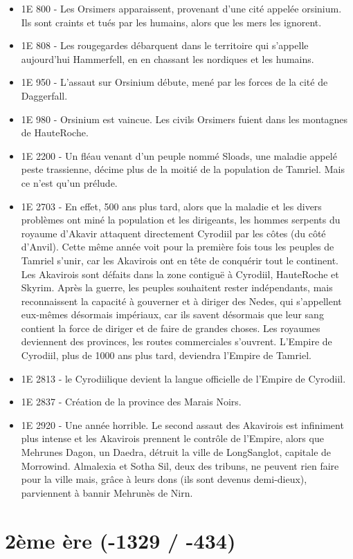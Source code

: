 \begin{itemize}
\item
1E 800 - Les Orsimers apparaissent, provenant d'une cité appelée orsinium. Ils sont craints et tués par les humains, alors que les mers les ignorent.
\item
1E 808 - Les rougegardes débarquent dans le territoire qui s'appelle aujourd'hui Hammerfell, en en chassant les nordiques et les humains.
\item
1E 950 - L'assaut sur Orsinium débute, mené par les forces de la cité de Daggerfall.
\item
1E 980 - Orsinium est vaincue. Les civils Orsimers fuient dans les montagnes de HauteRoche.
\item
1E 2200 - Un fléau venant d'un peuple nommé Sloads, une maladie appelé peste trassienne, décime plus de la moitié de la population de Tamriel. Mais ce n'est qu'un prélude.
\item
1E 2703 - En effet, 500 ans plus tard, alors que la maladie et les divers problèmes ont miné la population et les dirigeants, les hommes serpents du royaume d'Akavir attaquent directement Cyrodiil par les côtes (du côté d'Anvil). Cette même année voit pour la première fois tous les peuples de Tamriel s'unir, car les Akavirois ont en tête de conquérir tout le continent. Les Akavirois sont défaits dans la zone contiguë à Cyrodiil, HauteRoche et Skyrim. Après la guerre, les peuples souhaitent rester indépendants, mais reconnaissent la capacité à gouverner et à diriger des Nedes, qui s'appellent eux-mêmes désormais impériaux, car ils savent désormais que leur sang contient la force de diriger et de faire de grandes choses. Les royaumes deviennent des provinces, les routes commerciales s'ouvrent. L'Empire de Cyrodiil, plus de 1000 ans plus tard, deviendra l'Empire de Tamriel.
\item
1E 2813 - le Cyrodiilique devient la langue officielle de l'Empire de Cyrodiil.
\item
1E 2837 - Création de la province des Marais Noirs.
\item
1E 2920 - Une année horrible. Le second assaut des Akavirois est infiniment plus intense et les Akavirois prennent le contrôle de l'Empire, alors que Mehrunes Dagon, un Daedra, détruit la ville de LongSanglot, capitale de Morrowind. Almalexia et Sotha Sil, deux des tribuns, ne peuvent rien faire pour la ville mais, grâce à leurs dons (ils sont devenus demi-dieux), parviennent à bannir Mehrunès de Nirn.
\end{itemize}

\section{2ème ère (-1329 / -434)}

